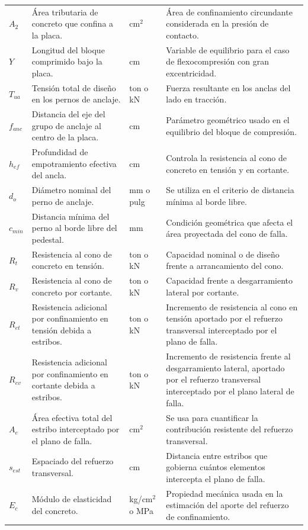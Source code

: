\begin{longtable}{p{} p{} p{} p{}}
$A_2$ & Área tributaria de concreto que confina a la placa. & cm$^2$ & Área de confinamiento circundante considerada en la presión de contacto. \\
$Y$ & Longitud del bloque comprimido bajo la placa. & cm & Variable de equilibrio para el caso de flexocompresión con gran excentricidad. \\
$T_{ua}$ & Tensión total de diseño en los pernos de anclaje. & ton o kN & Fuerza resultante en los anclas del lado en tracción. \\
$f_{anc}$ & Distancia del eje del grupo de anclaje al centro de la placa. & cm & Parámetro geométrico usado en el equilibrio del bloque de compresión. \\
$h_{ef}$ & Profundidad de empotramiento efectiva del ancla. & cm & Controla la resistencia al cono de concreto en tensión y en cortante. \\
$d_o$ & Diámetro nominal del perno de anclaje. & mm o pulg & Se utiliza en el criterio de distancia mínima al borde libre. \\
$c_{min}$ & Distancia mínima del perno al borde libre del pedestal. & mm & Condición geométrica que afecta el área proyectada del cono de falla. \\
$R_t$ & Resistencia al cono de concreto en tensión. & ton o kN & Capacidad nominal o de diseño frente a arrancamiento del cono. \\
$R_v$ & Resistencia al cono de concreto por cortante. & ton o kN & Capacidad frente a desgarramiento lateral por cortante. \\
$R_{et}$ & Resistencia adicional por confinamiento en tensión debida a estribos. & ton o kN & Incremento de resistencia al cono en tensión aportado por el refuerzo transversal interceptado por el plano de falla. \\
$R_{ev}$ & Resistencia adicional por confinamiento en cortante debida a estribos. & ton o kN & Incremento de resistencia frente al desgarramiento lateral, aportado por el refuerzo transversal interceptado por el plano lateral de falla. \\
$A_e$ & Área efectiva total del estribo interceptado por el plano de falla. & cm$^2$ & Se usa para cuantificar la contribución resistente del refuerzo transversal. \\
$s_{est}$ & Espaciado del refuerzo transversal. & cm & Distancia entre estribos que gobierna cuántos elementos intercepta el plano de falla. \\
$E_c$ & Módulo de elasticidad del concreto. & kg/cm$^2$ o MPa & Propiedad mecánica usada en la estimación del aporte del refuerzo de confinamiento. \\

\end{longtable}
